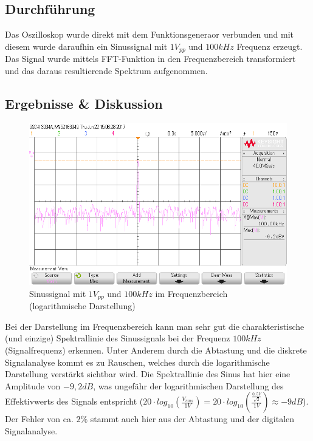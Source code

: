 \documentclass[12pt,a4paper,titlepage]{article}
\begin{document}
\subsection*{Durchf\"uhrung}
Das Oszilloskop wurde direkt mit dem Funktionsgeneraor verbunden und mit diesem wurde daraufhin ein Sinussignal mit $1 V_{pp}$ und $100kHz$ Frequenz erzeugt. Das Signal wurde mittels FFT-Funktion in den Frequenzbereich transformiert und das daraus resultierende Spektrum aufgenommen.

\subsection*{Ergebnisse \& Diskussion}

\begin{figure}[H]
  \centering
  \includegraphics[width=150mm]{scope_36.png}
  \caption{Sinussignal mit $1V_{pp}$ und $100kHz$ im Frequenzbereich (logarithmische Darstellung)}
\end{figure}

\noindent Bei der Darstellung im Frequenzbereich kann man sehr gut die charakteristische (und einzige) Spektrallinie des Sinussignals bei der Frequenz $100kHz$ (Signalfrequenz) erkennen. Unter Anderem durch die Abtastung und die diskrete Signalanalyse kommt es zu Rauschen, welches durch die logarithmische Darstellung verstärkt sichtbar wird. Die Spektrallinie des Sinus hat hier eine Amplitude von $-9,2dB$, was ungefähr der logarithmischen Darstellung des Effektivwerts des Signals entspricht ($20 \cdot log_{10} (\frac{V_{rms}}{1V}) = 20 \cdot log_{10} \left(\frac{\frac{0,5V}{\sqrt{2}}}{1V}\right) \approx -9dB$). Der Fehler von ca. $2\%$ stammt auch hier aus der Abtastung und der digitalen Signalanalyse.\\
\end{document}
